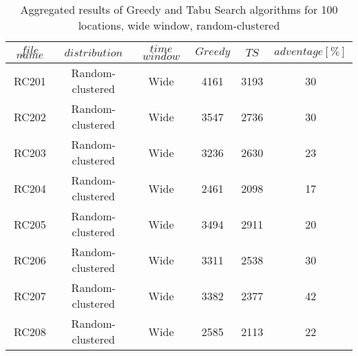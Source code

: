 \begin{table}[t]
\centering
\caption{
Aggregated results of Greedy and Tabu Search algorithms for 100 locations, wide window, random-clustered}
\begin{tabular*}{0.8\linewidth}{@{\extracolsep{\fill}}cccccc}
\toprule
$file$ $name$ & $distribution$ & $time$ $window$ & $Greedy$ & $TS$ & $adventage[\%]$ \\ \midrule
RC201 & Random-clustered & Wide & 4161 & 3193 & 30\\
RC202 & Random-clustered & Wide & 3547 & 2736 & 30\\
RC203 & Random-clustered & Wide & 3236 & 2630 & 23\\
RC204 & Random-clustered & Wide & 2461 & 2098 & 17\\
RC205 & Random-clustered & Wide & 3494 & 2911 & 20\\
RC206 & Random-clustered & Wide & 3311 & 2538 & 30\\
RC207 & Random-clustered & Wide & 3382 & 2377 & 42\\
RC208 & Random-clustered & Wide & 2585 & 2113 & 22\\
\end{tabular*}\end{table}